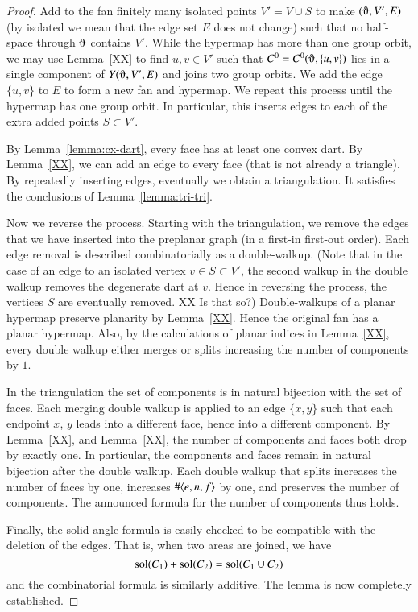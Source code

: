 \begin{proof}  
Add to the fan finitely many isolated
points  $V' = V\cup S$ to make $(\orgn,V',E)$ (by isolated we mean that the edge set $E$ does not change) such that no half-space
through $\orgn$ contains $V'$.    While the hypermap
has more than one group orbit, 
we may use Lemma~\ref{XX} to find $u,v\in V'$ such
that $C^0=C^0(\orgn,\{u,v\})$ lies in a single component of $Y(\orgn,V',E)$ and
joins two group orbits.  We add the edge $\{u,v\}$ to $E$ to form
a new fan and hypermap.
We repeat this process until the hypermap has one group orbit.  In particular, this
inserts edges to each of the extra added points $S\subset V'$.


By Lemma~\ref{lemma:cx-dart},
every face has at least one convex dart.  By Lemma~\ref{XX},
we can add an edge to every face (that is not already a triangle).  By repeatedly
inserting edges, eventually we obtain a triangulation.  It satisfies
the conclusions of Lemma~\ref{lemma:tri-tri}.

Now we reverse the process.  Starting with the triangulation, we remove the
edges that we have inserted into the preplanar graph  (in a first-in first-out order).  
Each edge removal is
described combinatorially as a double-walkup.  (Note that
in the case of an edge to an isolated vertex  $v\in S\subset V'$, the second walkup
in the double walkup
 removes the degenerate dart at $v$.  Hence in reversing the process,
the vertices $S$ are eventually removed. XX Is that so?)  Double-walkups of
a planar hypermap preserve planarity by Lemma~\ref{XX}.  Hence the original
fan has a planar hypermap.  Also, by the calculations of planar indices
in Lemma~\ref{XX}, every double walkup either merges or  splits
 increasing the number of components by $1$.

In the triangulation the set of components is in natural bijection with the set of faces.
Each merging double walkup is applied to an edge $\{x,y\}$ such that each endpoint $x$,
$y$ leads into a different face, hence into a different component.  By Lemma~\ref{XX},
and Lemma~\ref{XX}, the number of components and faces both drop by exactly one.
In particular, the components and faces remain in natural bijection after the
double walkup.  Each double walkup that splits increases the number of faces by one,
increases $\#\langle e,n,f\rangle$ by one, and preserves the number of components.
The announced formula for the number of components thus holds.

Finally, the solid angle formula is easily checked to be compatible with
the deletion of the edges.  That is, when two areas are joined, we have
  $${\operatorname{sol}}(C_1) + {\operatorname{sol}}(C_2) = {\operatorname{sol}}(C_1\cup C_2)$$
and the combinatorial formula is similarly additive.
The lemma is now completely established.
\end{proof}



